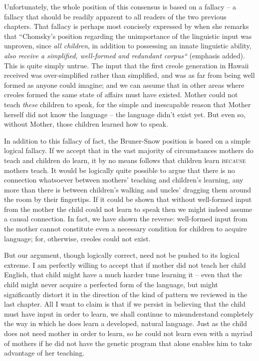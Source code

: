 Unfortunately, the whole position of this consensus is based on a fallacy -- a fallacy that should be readily apparent to all readers of the two previous chapters. That fallacy is perhaps most concisely expressed
by \citet[367]{Snow1979} when she remarks that ``Chomsky's position regarding the unimportance of the linguistic input was unproven, since \textit{all children}, in addition to possessing an innate linguistic ability, \textit{also receive a simplified, well-formed and redundant corpus``} (emphasis added). This is quite simply untrue. The input that the first creole generation in Hawaii received was over-simplified rather than simplified, and was as far from being well formed as anyone could imagine; and we can assume that in other areas where creoles formed the same state of affairs must have existed. Mother could not teach \textit{these} children to speak, for the simple and inescapable reason that Mother herself did not know the language -- the language didn't exist yet. But even so, without Mother, those children learned how to speak.

In addition to this fallacy of fact, the Bruner-Snow position is based on a simple logical fallacy. If we accept that in the vast majority of circumstances mothers do teach and children do learn, it by no means follows that children learn \textsc{because} mothers teach. It would be logically quite possible to argue that there is no connection whatsoever between mothers' teaching and children's learning, any more than there is between children's walking and uncles' dragging them around the room by their fingertips. If it could be shown that without well-formed input from the mother the child could not learn to speak then we might indeed assume a causal connection. In fact, we have shown the reverse: well-formed input from the mother cannot constitute even a necessary condition for children to acquire language; for, otherwise, creoles could not exist.

But our argument, though logically correct, need not be pushed to its logical extreme. I am perfectly willing to accept that if mother did not teach her child English, that child might have a much harder tune learning it -- even that the child might never acquire a perfected form of the language, but might significantly distort it in the direction of the kind of pattern we reviewed in the last chapter. All I want to claim is that if we persist in believing that the child must have input in order to learn, we shall continue to misunderstand completely the way in which he does learn a developed, natural language. Just as
the child does not need mother in order to learn, so he could not learn even with a myriad of mothers if he did not have the genetic program that alone enables him to take advantage of her teaching.

